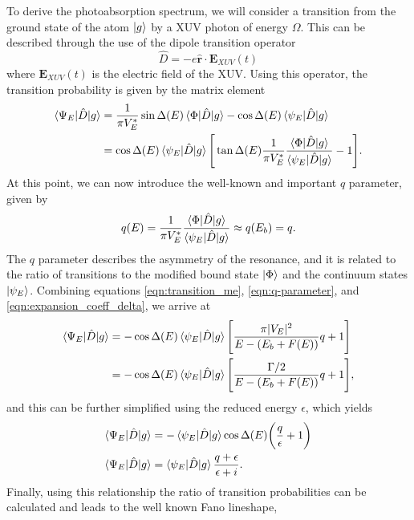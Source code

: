 To derive the photoabsorption spectrum, we will consider a transition from the ground state of the atom $\ket{g}$ by a XUV photon of energy $\Omega$.  This can be described through the use of the dipole transition operator
\begin{equation}
\label{eqn:dipole}
	\hat{D}=-e\mathbf{\hat{r}}\cdot\mathbf{E}_{XUV}(t)
\end{equation}
where $\mathbf{E}_{XUV}(t)$ is the electric field of the XUV.  Using this operator, the transition probability is given by the matrix element
\begin{equation}
\label{eqn:transition_me}
	\begin{aligned}
		\braket{\Psi_E|\hat{D}|g} &= \frac{1}{\pi V^*_{E}}\sin\Delta(E)\braket{\Phi|\hat{D}|g}-\cos\Delta(E)\braket{\psi_E|\hat{D}|g}\\
		&= \cos\Delta(E)\braket{\psi_E|\hat{D}|g}\Bigg[\tan\Delta(E)\frac{1}{\pi V^*_E}\frac{\braket{\Phi|\hat{D}|g}}{\braket{\psi_E|\hat{D}|g}} -1\Bigg].
	\end{aligned} 
\end{equation}
At this point, we can now introduce the well-known and important $q$ parameter, given by
\begin{equation}
\label{eqn:q-parameter}
	q(E) = \frac{1}{\pi V^*_E}\frac{\braket{\Phi|\hat{D}|g}}{\braket{\psi_E|\hat{D}|g}}\approx q(E_b)=q.
\end{equation}
The $q$ parameter describes the asymmetry of the resonance, and it is related to the ratio of transitions to the modified bound state $\ket{\Phi}$ and the continuum states $\ket{\psi_E}$.  Combining equations \ref{eqn:transition_me}, \ref{eqn:q-parameter}, and \ref{eqn:expansion_coeff_delta}, we arrive at
\begin{align}
	\braket{\Psi_E|\hat{D}|g} &=-\cos\Delta(E)\braket{\psi_E|\hat{D}|g}\Bigg[\frac{\pi\lvert V_E \rvert^2}{E-(E_b+F(E))}q+1\Bigg]\\
	&=-\cos\Delta(E)\braket{\psi_E|\hat{D}|g}\Bigg[\frac{\Gamma/2}{E-(E_b+F(E))}q+1\Bigg],
\end{align}
and this can be further simplified using the reduced energy $\epsilon$, which yields
\begin{align}
	\braket{\Psi_E|\hat{D}|g} &= -\braket{\psi_E|\hat{D}|g}\cos\Delta(E)\bigg(\frac{q}{\epsilon}+1\bigg)\\
\label{eqn:fano_matirx_elements}
	\braket{\Psi_E|\hat{D}|g} &= \braket{\psi_E|\hat{D}|g}\frac{q+\epsilon}{\epsilon+i}.
\end{align}
Finally, using this relationship the ratio of transition probabilities can be calculated and leads to the well known Fano lineshape,
